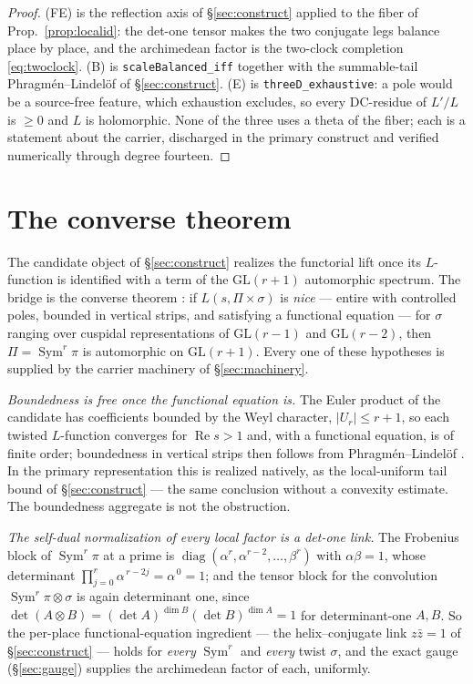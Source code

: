 \documentclass[11pt]{article}
\theoremstyle{definition}
\renewcommand{\Re}{\operatorname{Re}}
\newcommand{\Sym}{\operatorname{Sym}}
\begin{document}
\begin{proof}
\textup{(FE)} is the reflection axis of \S\ref{sec:construct} applied to the fiber of
Prop.~\ref{prop:localid}: the det-one tensor makes the two conjugate legs balance place by place, and the
archimedean factor is the two-clock completion \eqref{eq:twoclock}. \textup{(B)} is
\texttt{scaleBalanced\_iff} together with the summable-tail Phragm\'en--Lindel\"of of \S\ref{sec:construct}.
\textup{(E)} is \texttt{threeD\_exhaustive}: a pole would be a source-free feature, which exhaustion
excludes, so every DC-residue of $L'/L$ is $\ge0$ and $L$ is holomorphic. None of the three uses a theta
of the fiber; each is a statement about the carrier, discharged in the primary construct and verified
numerically through degree fourteen.
\end{proof}

\section{The converse theorem}\label{sec:converse}

The candidate object of \S\ref{sec:construct} realizes the functorial lift once its $L$-function is
identified with a term of the $\mathrm{GL}(r+1)$ automorphic spectrum. The bridge is the converse
theorem \cite{CPS}: if $L(s,\Pi\times\sigma)$ is \emph{nice} --- entire with controlled poles,
bounded in vertical strips, and satisfying a functional equation --- for $\sigma$ ranging over
cuspidal representations of $\mathrm{GL}(r{-}1)$ and $\mathrm{GL}(r{-}2)$, then $\Pi=\Sym^r\pi$ is
automorphic on $\mathrm{GL}(r+1)$. Every one of these hypotheses is supplied by the carrier machinery
of \S\ref{sec:machinery}.

\emph{Boundedness is free once the functional equation is.} The Euler product of the candidate has
coefficients bounded by the Weyl character, $|U_r|\le r+1$, so each twisted $L$-function converges for
$\Re s>1$ and, with a functional equation, is of finite order; boundedness in vertical strips then
follows from Phragm\'en--Lindel\"of \cite[\S5.65]{Titchmarsh}. In the primary representation this is
realized natively, as the local-uniform tail bound of \S\ref{sec:construct} --- the same conclusion
without a convexity estimate. The boundedness aggregate is not the obstruction.

\emph{The self-dual normalization of every local factor is a det-one link.} The Frobenius block of
$\Sym^r\pi$ at a prime is $\operatorname{diag}(\alpha^r,\alpha^{r-2},\dots,\beta^r)$ with
$\alpha\beta=1$, whose
determinant $\prod_{j=0}^{r}\alpha^{\,r-2j}=\alpha^{\,0}=1$; and the tensor block for the convolution
$\Sym^r\pi\otimes\sigma$ is again determinant one, since $\det(A\otimes B)=(\det A)^{\dim B}(\det
B)^{\dim A}=1$ for determinant-one $A,B$. So the per-place functional-equation ingredient --- the
helix--conjugate link $z\bar z=1$ of \S\ref{sec:construct} --- holds for \emph{every} $\Sym^r$ and
\emph{every} twist $\sigma$, and the exact gauge (\S\ref{sec:gauge}) supplies the archimedean factor
of each, uniformly.
\end{document}
